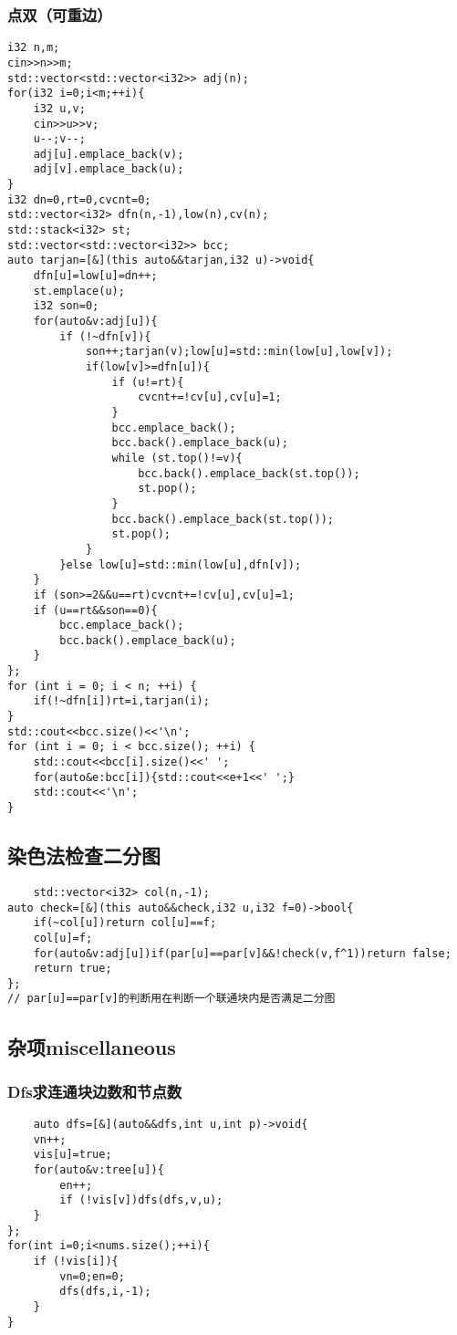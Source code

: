 \documentclass[UTF8]{ctexart}
\begin{document}
\subsubsection{点双（可重边）}
\begin{lstlisting}
i32 n,m;
cin>>n>>m;
std::vector<std::vector<i32>> adj(n);
for(i32 i=0;i<m;++i){
    i32 u,v;
    cin>>u>>v;
    u--;v--;
    adj[u].emplace_back(v);
    adj[v].emplace_back(u);
}
i32 dn=0,rt=0,cvcnt=0;
std::vector<i32> dfn(n,-1),low(n),cv(n);
std::stack<i32> st;
std::vector<std::vector<i32>> bcc;
auto tarjan=[&](this auto&&tarjan,i32 u)->void{
    dfn[u]=low[u]=dn++;
    st.emplace(u);
    i32 son=0;
    for(auto&v:adj[u]){
        if (!~dfn[v]){
            son++;tarjan(v);low[u]=std::min(low[u],low[v]);
            if(low[v]>=dfn[u]){
                if (u!=rt){
                    cvcnt+=!cv[u],cv[u]=1;
                }
                bcc.emplace_back();
                bcc.back().emplace_back(u);
                while (st.top()!=v){
                    bcc.back().emplace_back(st.top());
                    st.pop();
                }
                bcc.back().emplace_back(st.top());
                st.pop();
            }
        }else low[u]=std::min(low[u],dfn[v]);
    }
    if (son>=2&&u==rt)cvcnt+=!cv[u],cv[u]=1;
    if (u==rt&&son==0){
        bcc.emplace_back();
        bcc.back().emplace_back(u);
    }
};
for (int i = 0; i < n; ++i) {
    if(!~dfn[i])rt=i,tarjan(i);
}
std::cout<<bcc.size()<<'\n';
for (int i = 0; i < bcc.size(); ++i) {
    std::cout<<bcc[i].size()<<' ';
    for(auto&e:bcc[i]){std::cout<<e+1<<' ';}
    std::cout<<'\n';
}
\end{lstlisting}
\subsection{染色法检查二分图}
\begin{lstlisting}
    std::vector<i32> col(n,-1);
auto check=[&](this auto&&check,i32 u,i32 f=0)->bool{
    if(~col[u])return col[u]==f;
    col[u]=f;
    for(auto&v:adj[u])if(par[u]==par[v]&&!check(v,f^1))return false;
    return true;
};
// par[u]==par[v]的判断用在判断一个联通块内是否满足二分图
\end{lstlisting}
\subsection{杂项miscellaneous}
\subsubsection{Dfs求连通块边数和节点数}
\begin{lstlisting}
    auto dfs=[&](auto&&dfs,int u,int p)->void{
    vn++;
    vis[u]=true;
    for(auto&v:tree[u]){
        en++;
        if (!vis[v])dfs(dfs,v,u);
    }
};
for(int i=0;i<nums.size();++i){
    if (!vis[i]){
        vn=0;en=0;
        dfs(dfs,i,-1);
    }
}
\end{lstlisting}
\end{document}
